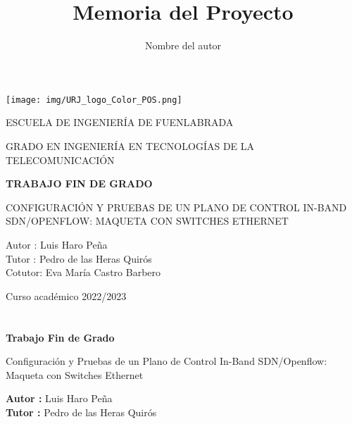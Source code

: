 \documentclass[a4paper, 12pt]{book}
\title{Memoria del Proyecto}
\author{Nombre del autor}
\begin{document}
	
	\renewcommand{\refname}{Bibliografía}  %
	\renewcommand{\appendixname}{Apéndice}
	
	
	
	\begin{titlepage}
		\begin{center}
			\texttt{[image: img/URJ\_logo\_Color\_POS.png]}
			
			\vspace{1.75cm}
			
			\LARGE
			ESCUELA DE INGENIERÍA DE FUENLABRADA
			\vspace{1cm}
			
			\LARGE
			GRADO EN INGENIERÍA EN TECNOLOGÍAS DE LA TELECOMUNICACIÓN
			
			\vspace{1cm}
			\LARGE
			\textbf{TRABAJO FIN DE GRADO}
			
			\vspace{1cm}
			
			\Large
			CONFIGURACIÓN Y PRUEBAS DE UN PLANO DE CONTROL IN-BAND SDN/OPENFLOW: MAQUETA CON SWITCHES ETHERNET  
			
			\vspace{2cm}
			
			\large
			Autor : Luis Haro Peña \\
			Tutor : Pedro de las Heras Quirós\\
			Cotutor: Eva María Castro Barbero
			\vspace{1cm}
			
			\large
			Curso académico 2022/2023
			
		\end{center}
	\end{titlepage}
	
	\newpage
	\mbox{}
	\thispagestyle{empty} %
	
	
	
	\clearpage
	\chapter*{}
	
	\vspace{-4cm}
	\begin{center}
		\LARGE
		\textbf{Trabajo Fin de Grado}
		
		\vspace{1cm}
		\large
		Configuración y Pruebas de un Plano de Control In-Band SDN/Openflow: Maqueta con Switches Ethernet
		
		\vspace{1cm}
		\large
		\textbf{Autor :} Luis Haro Peña \\
		\textbf{Tutor :} Pedro de las Heras Quirós
		
	\end{center}
	
\end{document}

